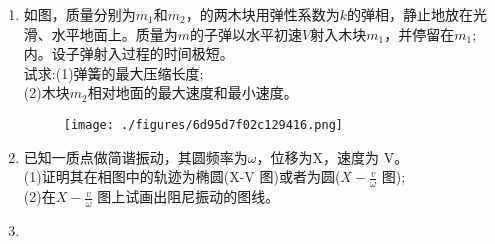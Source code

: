 
\begin{enumerate}
\item 如图，质量分别为$m_1$和$m_2$，的两木块用弹性系数为$k$的弹相，静止地放在光滑、水平地面上。质量为$m$的子弹以水平初速$V$射入木块$m_1$，并停留在$m_1$;内。设子弹射入过程的时间极短。\\
试求:(1)弹簧的最大压缩长度;\\
(2)木块$m_2$相对地面的最大速度和最小速度。
\begin{figure}[ht]
\centering
\texttt{[image: ./figures/6d95d7f02c129416.png]}
\caption{} \label{fig_SSD02_1}
\end{figure}
\item  已知一质点做简谐振动，其圆频率为$\omega$，位移为X，速度为 V。\\
(1)证明其在相图中的轨迹为椭圆(X-V 图)或者为圆($\displaystyle X-\frac{v}{\omega}$ 图);\\
(2)在$\displaystyle X-\frac{v}{\omega}$ 图上试画出阻尼振动的图线。
\item 
\end{enumerate}